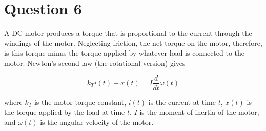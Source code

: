 \documentclass[12pt]{article}
\begin{document}
\vfil
\clearpage


















\section{Question 6}
A DC motor produces a torque that is proportional to the current through the windings of the motor. Neglecting friction, the net torque on the motor, therefore, is this torque minus the torque applied by whatever load is connected to the motor. Newton’s second law (the rotational version) gives

$$ k_{T}i(t)-x(t)=I\frac{d}{dt}\omega(t) $$

where $k_T$ is the motor torque constant, $i(t)$ is the current at time $t$, $x(t)$ is the torque
applied by the load at time $t$, $I$ is the moment of inertia of the motor, and $\omega(t)$ is
the angular velocity of the motor.
\end{document}
